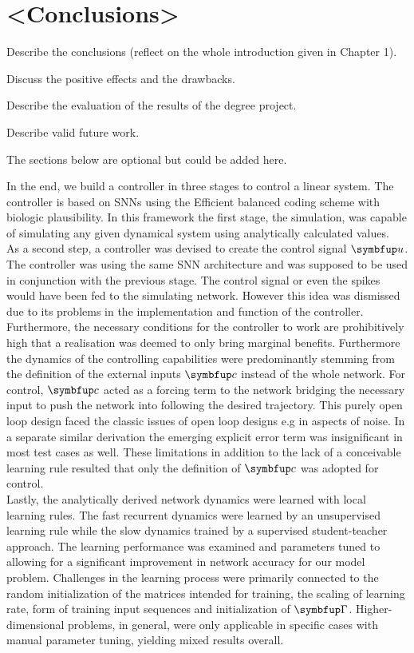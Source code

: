 \chapter{<Conclusions>}
Describe the conclusions (reflect on the whole introduction given in Chapter 1).

Discuss the positive effects and the drawbacks.

Describe the evaluation of the results of the degree project.

Describe valid future work.

The sections below are optional but could be added here.


In the end, we build a controller in three stages to control a linear system. The controller is based on \acp{SNN} using the Efficient balanced coding scheme with biologic plausibility. In this framework the first stage, the simulation, was capable of simulating any given dynamical system using analytically calculated values.\\
As a second step, a controller was devised to create the control signal $\bmu{u}$. The controller was using the same \ac{SNN} architecture and was supposed to be used in conjunction with the previous stage. The control signal or even the spikes would have been fed to the simulating network. However this idea was dismissed due to its problems in the implementation and function of the controller. Furthermore, the necessary conditions for the controller to work are prohibitively high that a realisation was deemed to only bring marginal benefits. Furthermore the dynamics of the controlling capabilities were predominantly stemming from the definition of the external inputs $\bmu{c}$ instead of the whole network. For control, $\bmu{c}$ acted as a forcing term to the network bridging the necessary input to push the network into following the desired trajectory. This purely open loop design faced the classic issues of open loop designs e.g in aspects of noise. In a separate similar derivation the emerging explicit error term was insignificant in most test cases as well. These limitations in addition to the lack of a conceivable learning rule resulted that only the definition of $\bmu{c}$ was adopted for control.\\
Lastly, the analytically derived network dynamics were learned with local learning rules. The fast recurrent dynamics were learned by an unsupervised learning rule while the slow dynamics trained by a supervised student-teacher approach. The learning performance was examined and parameters tuned to allowing for a significant improvement in network accuracy for our model problem. Challenges in the learning process were primarily connected to the random initialization of the matrices intended for training, the scaling of learning rate, form of training input sequences and initialization of $\bmu{\Gamma}$. Higher-dimensional problems, in general, were only applicable in specific cases with manual parameter tuning, yielding mixed results overall.\\

